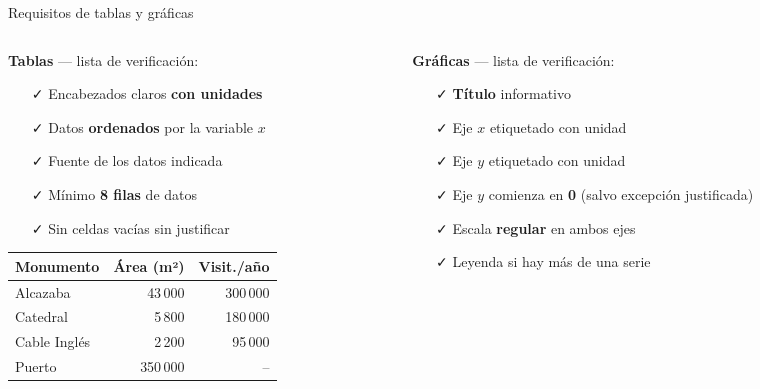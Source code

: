 \documentclass[aspectratio=169, 10pt, spanish]{beamer}
\begin{document}

\begin{frame}{Requisitos de tablas y gráficas}
  \begin{columns}[T]
    \begin{column}{0.48\textwidth}
      \textbf{Tablas} — lista de verificación:
      \begin{itemize}
        \item[\faCheck] Encabezados claros \textbf{con unidades}
        \item[\faCheck] Datos \textbf{ordenados} por la variable $x$
        \item[\faCheck] Fuente de los datos indicada
        \item[\faCheck] Mínimo \textbf{8 filas} de datos
        \item[\faCheck] Sin celdas vacías sin justificar
      \end{itemize}
      \vspace{6pt}
      \begin{tabular}{lrr}
        \toprule
        \textbf{Monumento} & \textbf{Área (m²)} & \textbf{Visit./año}\\
        \midrule
        Alcazaba & 43\,000 & 300\,000\\
        Catedral & 5\,800  & 180\,000\\
        Cable Inglés & 2\,200 & 95\,000\\
        Puerto & 350\,000 & --\\
        \bottomrule
      \end{tabular}
    \end{column}
    \begin{column}{0.48\textwidth}
      \textbf{Gráficas} — lista de verificación:
      \begin{itemize}
        \item[\faCheck] \textbf{Título} informativo
        \item[\faCheck] Eje $x$ etiquetado con unidad
        \item[\faCheck] Eje $y$ etiquetado con unidad
        \item[\faCheck] Eje $y$ comienza en \textbf{0} (salvo excepción justificada)
        \item[\faCheck] Escala \textbf{regular} en ambos ejes
        \item[\faCheck] Leyenda si hay más de una serie

\end{itemize}
\end{column}
\end{columns}
\end{frame}
\end{document}
